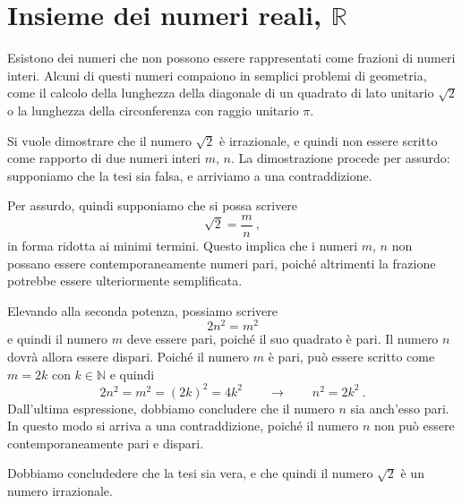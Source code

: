 \section{Insieme dei numeri reali, $\mathbb{R}$}
Esistono dei numeri che non possono essere rappresentati come frazioni di numeri interi. Alcuni di questi numeri compaiono in semplici problemi di geometria, come il calcolo della lunghezza della diagonale di un quadrato di lato unitario  $\sqrt{2}$ o la lunghezza della circonferenza con raggio unitario $\pi$.

\begin{example} Si vuole dimostrare che il numero $\sqrt{2}$ è irrazionale, e quindi non essere scritto come rapporto di due numeri interi $m$, $n$. La dimostrazione procede per assurdo: supponiamo che la tesi sia falsa, e arriviamo a una contraddizione.

Per assurdo, quindi supponiamo che si possa scrivere
\begin{equation}
\sqrt{2} = \dfrac{m}{n} \ ,
\end{equation}
in forma ridotta ai minimi termini. Questo implica che i numeri $m$, $n$ non possano essere contemporaneamente numeri pari, poiché altrimenti la frazione potrebbe essere ulteriormente semplificata.

Elevando alla seconda potenza, possiamo scrivere
\begin{equation}
  2 n^2 = m^2
\end{equation}
e quindi il numero $m$ deve essere pari, poiché il suo quadrato è pari. Il numero $n$ dovrà allora essere dispari.
Poiché il numero $m$ è pari, può essere scritto come $m = 2k$ con $k \in \mathbb{N}$ e quindi
\begin{equation}
  2 n^2 = m^2 = (2k)^2 = 4 k^2 \qquad \rightarrow \qquad n^2 = 2 k^2 \ .
\end{equation}
Dall'ultima espressione, dobbiamo concludere che il numero $n$ sia anch'esso pari. In questo modo si arriva a una contraddizione, poiché il numero $n$ non può essere contemporaneamente pari e dispari.

Dobbiamo concludedere che la tesi sia vera, e che quindi il numero $\sqrt{2}$ è un numero irrazionale.
\end{example}

